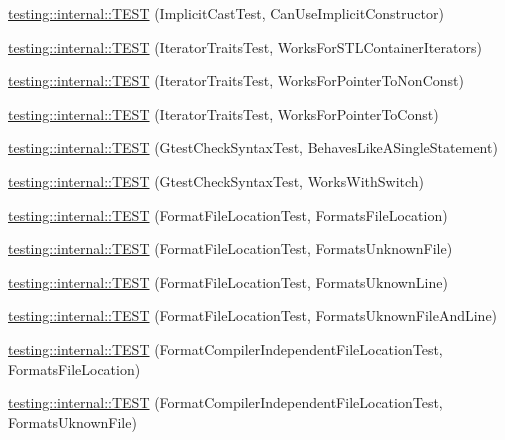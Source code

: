 \begin{DoxyCompactItemize}
\item 
\mbox{\hyperlink{namespacetesting_1_1internal_ad5c2cf37cc5aa78744012255cae78f9b}{testing\+::internal\+::\+T\+E\+ST}} (Implicit\+Cast\+Test, Can\+Use\+Implicit\+Constructor)
\item 
\mbox{\hyperlink{namespacetesting_1_1internal_abd56ca990c5b8c1aea44d15028a74f33}{testing\+::internal\+::\+T\+E\+ST}} (Iterator\+Traits\+Test, Works\+For\+S\+T\+L\+Container\+Iterators)
\item 
\mbox{\hyperlink{namespacetesting_1_1internal_a642234d85836450bb8795cf0a8a9f908}{testing\+::internal\+::\+T\+E\+ST}} (Iterator\+Traits\+Test, Works\+For\+Pointer\+To\+Non\+Const)
\item 
\mbox{\hyperlink{namespacetesting_1_1internal_afc0e95a0472d243967fd4720c681c478}{testing\+::internal\+::\+T\+E\+ST}} (Iterator\+Traits\+Test, Works\+For\+Pointer\+To\+Const)
\item 
\mbox{\hyperlink{namespacetesting_1_1internal_a26d00130a017a66d0d60dc5a02a13d25}{testing\+::internal\+::\+T\+E\+ST}} (Gtest\+Check\+Syntax\+Test, Behaves\+Like\+A\+Single\+Statement)
\item 
\mbox{\hyperlink{namespacetesting_1_1internal_a4dfd147ff396984fca799878cb53dcea}{testing\+::internal\+::\+T\+E\+ST}} (Gtest\+Check\+Syntax\+Test, Works\+With\+Switch)
\item 
\mbox{\hyperlink{namespacetesting_1_1internal_a1a1c20d78e9e75b9c7f2b767eb62611b}{testing\+::internal\+::\+T\+E\+ST}} (Format\+File\+Location\+Test, Formats\+File\+Location)
\item 
\mbox{\hyperlink{namespacetesting_1_1internal_ace2f5407afdfb0767035d44b6758e4a0}{testing\+::internal\+::\+T\+E\+ST}} (Format\+File\+Location\+Test, Formats\+Unknown\+File)
\item 
\mbox{\hyperlink{namespacetesting_1_1internal_a17d1f472b6c1154de7b5b008b964ee32}{testing\+::internal\+::\+T\+E\+ST}} (Format\+File\+Location\+Test, Formats\+Uknown\+Line)
\item 
\mbox{\hyperlink{namespacetesting_1_1internal_a1195aaf7258c5442de7aebd95acefb9f}{testing\+::internal\+::\+T\+E\+ST}} (Format\+File\+Location\+Test, Formats\+Uknown\+File\+And\+Line)
\item 
\mbox{\hyperlink{namespacetesting_1_1internal_a9c12f8c1ebb19906e8fa0c430d139076}{testing\+::internal\+::\+T\+E\+ST}} (Format\+Compiler\+Independent\+File\+Location\+Test, Formats\+File\+Location)
\item 
\mbox{\hyperlink{namespacetesting_1_1internal_a65ad1cad17717c1b8ac4c2d4bef5e079}{testing\+::internal\+::\+T\+E\+ST}} (Format\+Compiler\+Independent\+File\+Location\+Test, Formats\+Uknown\+File)

\end{DoxyCompactItemize}
